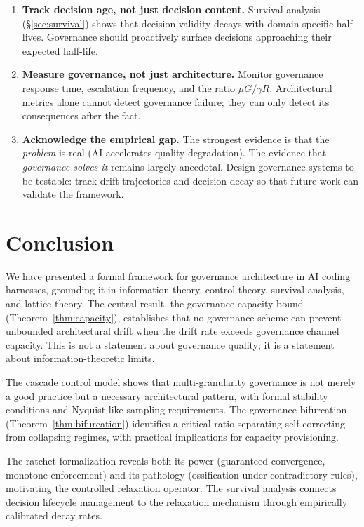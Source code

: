 \documentclass[11pt, a4paper, logo, copyright]{googledeepmind}
\begin{document}
\begin{enumerate}
    \item \textbf{Track decision age, not just decision content.} Survival analysis (\S\ref{sec:survival}) shows that decision validity decays with domain-specific half-lives. Governance should proactively surface decisions approaching their expected half-life.

    \item \textbf{Measure governance, not just architecture.} Monitor governance response time, escalation frequency, and the ratio $\mu G / \gamma R$. Architectural metrics alone cannot detect governance failure; they can only detect its consequences after the fact.

    \item \textbf{Acknowledge the empirical gap.} The strongest evidence is that the \emph{problem} is real (AI accelerates quality degradation). The evidence that \emph{governance solves it} remains largely anecdotal. Design governance systems to be testable: track drift trajectories and decision decay so that future work can validate the framework.
\end{enumerate}


\section{Conclusion}
\label{sec:conclusion}

We have presented a formal framework for governance architecture in AI coding harnesses, grounding it in information theory, control theory, survival analysis, and lattice theory. The central result, the governance capacity bound (Theorem~\ref{thm:capacity}), establishes that no governance scheme can prevent unbounded architectural drift when the drift rate exceeds governance channel capacity. This is not a statement about governance quality; it is a statement about information-theoretic limits.

The cascade control model shows that multi-granularity governance is not merely a good practice but a necessary architectural pattern, with formal stability conditions and Nyquist-like sampling requirements. The governance bifurcation (Theorem~\ref{thm:bifurcation}) identifies a critical ratio separating self-correcting from collapsing regimes, with practical implications for capacity provisioning.

The ratchet formalization reveals both its power (guaranteed convergence, monotone enforcement) and its pathology (ossification under contradictory rules), motivating the controlled relaxation operator. The survival analysis connects decision lifecycle management to the relaxation mechanism through empirically calibrated decay rates.
\end{document}
